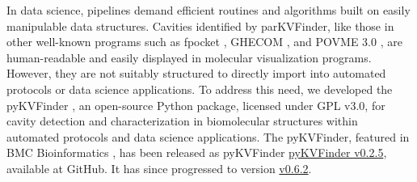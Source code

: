 \documentclass[Ingles]{phdthesis}
\def\eg{e.g.\onedot}
\begin{document}
In data science, pipelines demand efficient routines and algorithms built on easily manipulable data structures. Cavities identified by parKVFinder, like those in other well-known programs such as fpocket \cite{fpocket}, GHECOM \cite{ghecom}, and POVME 3.0 \cite{povme}, are human-readable and easily displayed in molecular visualization programs. However, they are not suitably structured to directly import into automated protocols or data science applications. To address this need, we developed the \ac{pyKVFinder} \cite{guerra2021}, an open-source Python package, licensed under GPL v3.0, for cavity detection and characterization in biomolecular structures within automated protocols and data science applications. The pyKVFinder, featured in BMC Bioinformatics \cite{guerra2021}, has been released as pyKVFinder \href{https://github.com/LBC-LNBio/pyKVFinder/tree/v0.2.5}{pyKVFinder v0.2.5}, available at GitHub. It has since progressed to version \href{https://github.com/LBC-LNBio/pyKVFinder/tree/v0.6.2}{v0.6.2}.

\end{document}

